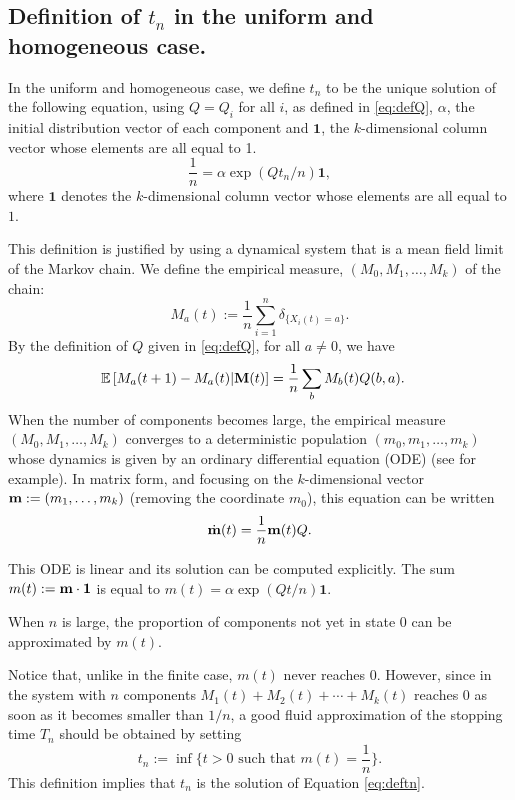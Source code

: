 \documentclass{aptpub}
\newcommand\expect[1]{\mathchoice{\bexpect{#1}}{\sexpect{#1}}{\sexpect{#1}}{\sexpect{#1}}}
\newcommand\bexpect[1]{\mathbb{E}\left[#1\right]}
\newcommand\sexpect[1]{\mathbb{E}[#1]}
\newcommand{\bydef}{:=}
\begin{document}
\subsection{Definition of $t_n$ in the uniform and homogeneous case.}
\label{ssec:defhomo}

In the uniform and homogeneous case, we define $t_n$ to be the unique
solution of the following equation, using $Q = Q_i$ for all $i$, as
defined in \eqref{eq:defQ}, $\alpha$, the initial distribution vector of
each component and $\mathbf{1}$, the $k$-dimensional column vector whose elements are all equal to 1.
\begin{equation}
  \frac{1}{n} = \alpha\exp(Qt_n/n)\mathbf{1},
  \label{eq:deftn}
\end{equation}
where $\mathbf{1}$ denotes the $k$-dimensional column vector whose
elements are all equal to $1$.

This definition is justified by using a dynamical system that is a
mean field limit of the Markov chain.  We define the empirical
measure, $(M_0,M_1,\dots ,M_k)$ of the chain:
\begin{equation*}
  M_a(t) \bydef \frac{1}{n} \sum_{i=1}^n {\delta}_{\{X_i(t) = a\}}.
\end{equation*}
By the definition of $Q$ given in \eqref{eq:defQ}, for all
$a \not= 0$, we have
\begin{align*}
  \expect{M_a(t+1) - M_a(t)|{\bf M}(t)} 
  & =  \frac1n\sum_{b} M_b(t) Q(b,a).
\end{align*}
When the number of components becomes large, the empirical measure
$(M_0,M_1,\dots ,M_k)$ converges to a deterministic population
$(m_0,m_1,\dots ,m_k)$ whose dynamics is given by an ordinary
differential equation (ODE) (see \cite{Kurtz} for example).  In matrix
form, and focusing on the $k$-dimensional vector
${\bf m} \bydef (m_1,\dots ,m_k)$ (removing the coordinate $m_0$),
this equation can be written
\begin{align}
 \dot{\bf m}(t) =  \frac{1}{n} {\bf m}(t) Q.
\label{eq:ode}
\end{align}

This ODE is linear and its solution can be computed explicitly.  The
sum $m(t) \bydef \bf m \cdot \mathbf{1}$ is equal to
$m(t)=\alpha\exp(Qt/n)\mathbf{1}$.

When $n$ is large, the proportion of components not yet in state $0$
can be approximated by $m(t)$. %

Notice that,  unlike in the finite case,   $m(t)$ never reaches $0$.  
However,  since in  the system with $n$ components  $M_1(t)+ M_2(t) + \cdots + M_k(t)$ reaches $0$ as soon as it becomes smaller than $1/n$, 
a 
good fluid approximation of the stopping time $T_n$ should be obtained by setting
\begin{equation}
  t_n := \inf\{t>0 \text{ such that } m(t)=\frac1n\}.
\end{equation}
This  definition implies that  $t_n$ is the solution of Equation
\eqref{eq:deftn}.
\end{document}
